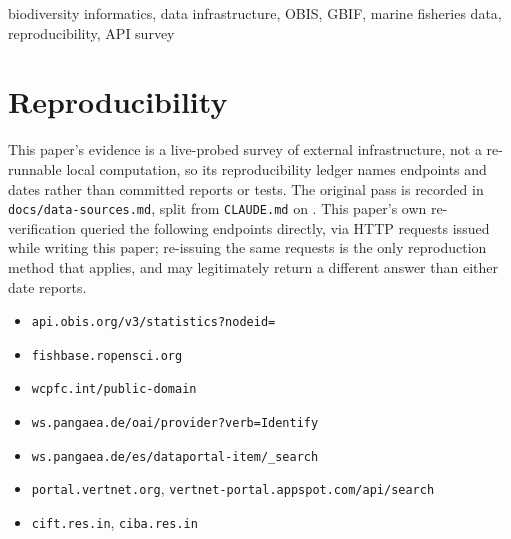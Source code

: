 \documentclass[conference]{IEEEtran}
\begin{document}
\begin{IEEEkeywords}
biodiversity informatics, data infrastructure, OBIS, GBIF, marine fisheries
data, reproducibility, API survey
\end{IEEEkeywords}



\section*{Reproducibility}
This paper's evidence is a live-probed survey of external infrastructure,
not a re-runnable local computation, so its reproducibility ledger names
endpoints and dates rather than committed reports or tests. The original
\ProbeDate{} pass is recorded in \texttt{docs/data-sources.md}, split from
\texttt{CLAUDE.md} on \SplitDate{}. This paper's own \AsOf{} re-verification
queried the following endpoints directly, via HTTP requests issued while
writing this paper; re-issuing the same requests is the only reproduction
method that applies, and may legitimately return a different answer than
either date reports.
{\raggedright\sloppy
\begin{itemize}\itemsep1pt\parskip0pt
\item[] \texttt{api.obis.org/\allowbreak{}v3/\allowbreak{}statistics?nodeid=\allowbreak{}\IndObisNodeId{}}
\item[] \texttt{fishbase.ropensci.org}
\item[] \texttt{wcpfc.int/\allowbreak{}public-domain}
\item[] \texttt{ws.pangaea.de/\allowbreak{}oai/\allowbreak{}provider?verb=Identify}
\item[] \texttt{ws.pangaea.de/\allowbreak{}es/\allowbreak{}dataportal-item/\_search}
\item[] \texttt{portal.vertnet.org}, \texttt{vertnet-portal.appspot.com/\allowbreak{}api/\allowbreak{}search}
\item[] \texttt{cift.res.in}, \texttt{ciba.res.in}
\end{itemize}}



\end{document}
